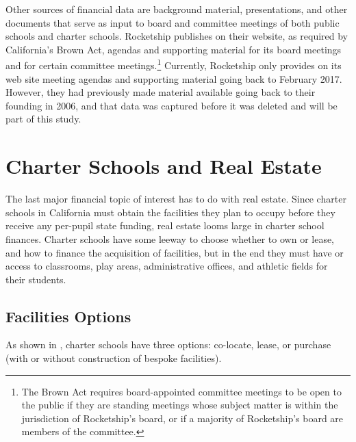 Other sources of financial data are background material, presentations, and other documents that serve as input to board and committee meetings of both public schools and charter schools.  Rocketship publishes on their website, as required by California's Brown Act, agendas and supporting material for its board meetings and for certain committee meetings.\footnote{The Brown Act requires board-appointed committee meetings to be open to the public if they are standing meetings whose subject matter is within the jurisdiction of Rocketship's board, or if a majority of Rocketship's board are members of the committee.} Currently, Rocketship only provides on its web site meeting agendas and supporting material going back to February 2017. However, they had previously made material available going back to their founding in 2006, and that data was captured before it was deleted and will be part of this study.

\section{Charter Schools and Real Estate}\label{sec:real-estate}\indent%

The last major financial topic of interest has to do with real estate. Since charter schools in California must obtain the facilities they plan to occupy before they receive any per-pupil state funding, real estate looms large in charter school finances. Charter schools have some leeway to choose whether to own or lease, and how to finance the acquisition of facilities, but in the end they must have or access to classrooms, play areas, administrative offices, and athletic fields for their students.

\subsection{Facilities Options}\label{sec:facilities-options}\indent%

As shown in , charter schools have three options: co-locate, lease, or purchase (with or without construction of bespoke facilities).

